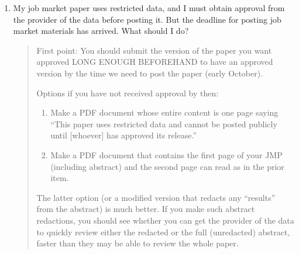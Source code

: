 \documentclass{\classes/econtex}
\begin{document}
\begin{enumerate}
\begin{quote}
    \hypertarget{restricted-data}{}  
  \end{quote}

\item  My job market paper uses restricted data, and I must obtain approval from the provider of the data before posting it. But the deadline for posting job market materials has arrived. What should I do?

  \begin{quote}
    First point: You should submit the version of the paper you want approved LONG ENOUGH BEFOREHAND to have an approved version by the time we need to post the paper (early October).

    Options if you have not received approval by then:
    \begin{enumerate}
    \item Make a PDF document whose entire content is one page saying ``This paper uses restricted data and cannot be posted publicly until [whoever] has approved its release.''
    \item Make a PDF document that contains the first page of your JMP (including abstract) and the second page can read as in the prior item.
    \end{enumerate}

    The latter option (or a modified version that redacts any ``results'' from the abstract) is much better. If you make such abstract redactions, you should see whether you can get the provider of the data to quickly review either the redacted or the full (unredacted) abstract, faster than they may be able to review the whole paper.

  \end{quote}
\end{enumerate}
\end{document}
